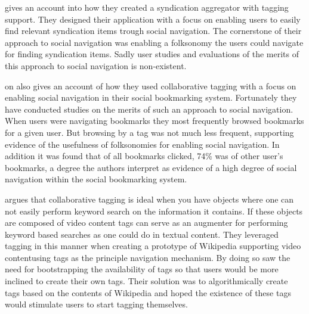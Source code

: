 \citet{jarrett05} gives an account into how they created a syndication
aggregator with tagging support. They designed their application with a focus
on enabling users to easily find relevant syndication items trough
social navigation. The cornerstone of their approach to social navigation was
enabling a folksonomy the users could navigate for finding syndication
items. Sadly user studies and evaluations
of the merits of this approach to social navigation is non-existent.

\citet{millen06} on also gives an account of how they used collaborative
tagging with a focus on enabling social navigation in their
 social bookmarking system. Fortunately they have conducted
studies on the merits of such an approach to social navigation. When users
were navigating bookmarks they most frequently browsed bookmarks for a given
user. But browsing by a tag was not much less frequent, supporting evidence of
the usefulness of folksonomies for enabling social navigation. In addition
it was found that of all bookmarks clicked, 74\% was of other user's
bookmarks, a degree the authors interpret as evidence of a high degree of
social navigation within the social bookmarking system.

\citet[]{fokker06} argues that collaborative tagging is ideal
when you have objects where one can not easily perform keyword search on the
information it contains. If these objects are composed of video content tags
can serve as an augmenter for performing keyword based searches as one could
do in textual content. They leveraged tagging in this manner when creating a
prototype of Wikipedia supporting video content\dash{}using tags as the
principle navigation mechanism. By doing so \citet[]{fokker06}
saw the need for bootstrapping the availability of tags so that users would be
more inclined to create their own tags. Their solution was to algorithmically
create tags based on the contents of Wikipedia and hoped the existence of
these tags would stimulate users to start tagging themselves.

